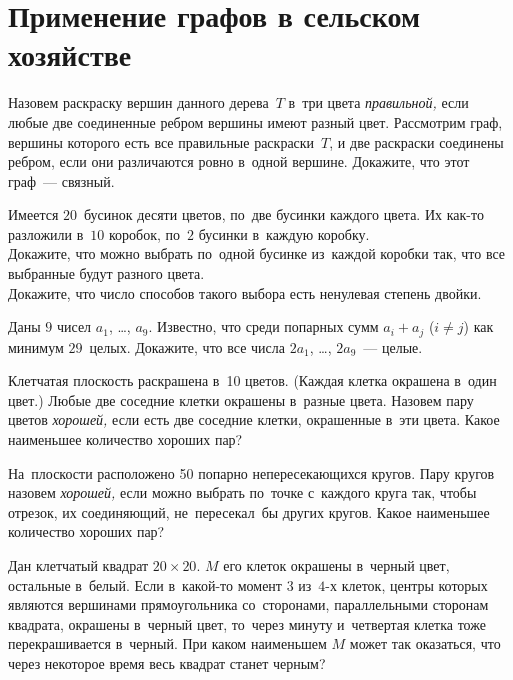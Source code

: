 
\section*{Применение графов в сельском хозяйстве}


\begin{problems}

\item
Назовем раскраску вершин данного дерева~$T$ в~три цвета \emph{правильной,}
если любые две соединенные ребром вершины имеют разный цвет.
Рассмотрим граф, вершины которого есть все правильные раскраски~$T$, и две
раскраски соединены ребром, если они различаются ровно в~одной вершине.
Докажите, что этот граф~--- связный.

\item
Имеется $20$~бусинок десяти цветов, по~две бусинки каждого цвета.
Их как-то разложили в~$10$ коробок, по~$2$ бусинки в~каждую коробку.
\\
\subproblem
Докажите, что можно выбрать по~одной бусинке из~каждой коробки так, что все
выбранные будут разного цвета.
\\
\subproblem
Докажите, что число способов такого выбора есть ненулевая степень двойки.

\item
Даны $9$ чисел $a_{1}$, \ldots, $a_{9}$.
Известно, что среди попарных сумм $a_{i} + a_{j}$ ($i \neq j$) как минимум
$29$~целых.
Докажите, что все числа $2 a_{1}$, \ldots, $2 a_{9}$~--- целые.

\item
Клетчатая плоскость раскрашена в~10 цветов.
(Каждая клетка окрашена в~один цвет.)
Любые две соседние клетки окрашены в~разные цвета.
Назовем пару цветов \emph{хорошей,} если есть две соседние клетки, окрашенные
в~эти цвета.
Какое наименьшее количество хороших пар?

\item
На~плоскости расположено 50 попарно непересекающихся кругов.
Пару кругов назовем \emph{хорошей,} если можно выбрать по~точке с~каждого круга
так, чтобы отрезок, их соединяющий, не~пересекал~бы других кругов.
Какое наименьшее количество хороших пар?

\item
Дан клетчатый квадрат $20 \times 20$.
$M$ его клеток окрашены в~черный цвет, остальные в~белый.
Если в~какой-то момент $3$ из~$4$-х клеток, центры которых являются вершинами
прямоугольника со~сторонами, параллельными сторонам квадрата, окрашены в~черный
цвет, то~через минуту и~четвертая клетка тоже перекрашивается в~черный.
При каком наименьшем $M$ может так оказаться, что через некоторое время весь
квадрат станет черным?


\end{problems}
